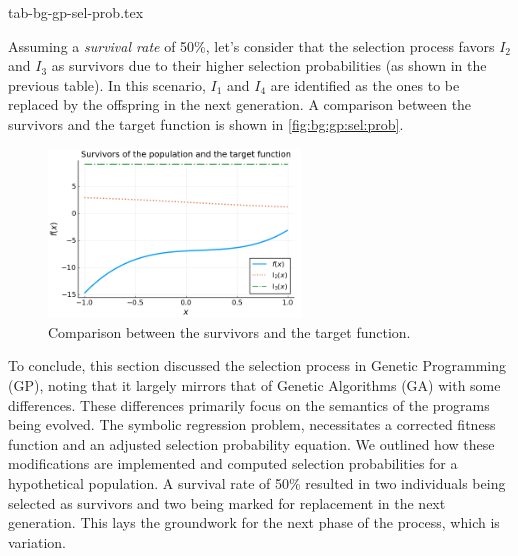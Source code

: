   {tab-bg-gp-sel-prob.tex}

  Assuming a \emph{survival rate} of 50\%, let's consider that the selection
  process favors \(I_2\) and \(I_3\) as survivors due to their higher selection
  probabilities (as shown in the previous table).
  In this scenario, \(I_1\) and \(I_4\) are identified as the ones to be replaced
  by the offspring in the next generation.
  A comparison between the survivors and the target function is shown in
  \vref{fig:bg:gp:sel:prob}.

  \begin{figure}[ht!]
    \centering
    \includegraphics[width=0.6\textwidth]{img/theoretical_framework/gp_pop_sel_survivors.png}
    \caption{Comparison between the survivors and the target function.}
    \label{fig:bg:gp:sel:prob}
  \end{figure}

  To conclude, this section discussed the selection process in Genetic 
  Programming (GP), noting that it largely mirrors that of Genetic Algorithms 
  (GA) with some differences.
  These differences primarily focus on the semantics of the programs being
  evolved.
  The symbolic regression problem, necessitates a corrected fitness function and
  an adjusted selection probability equation.
  We outlined how these modifications are implemented and computed selection
  probabilities for a hypothetical population.
  A survival rate of 50\% resulted in two individuals being selected as
  survivors and two being marked for replacement in the next generation.
  This lays the groundwork for the next phase of the process, which is
  variation.
